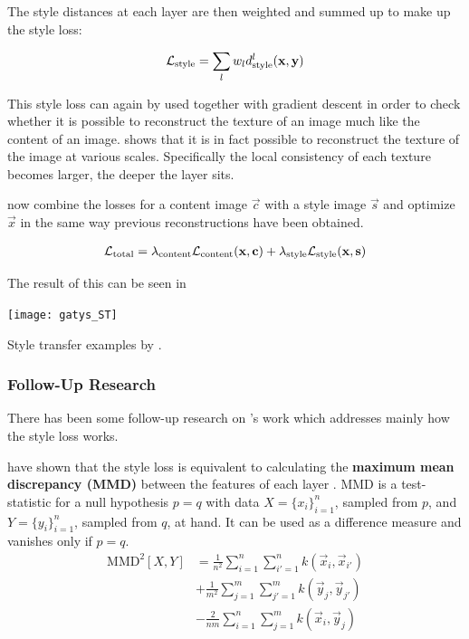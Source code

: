 
The style distances at each layer are then weighted and summed up to make up the style loss:

\begin{align}
    \mathcal{L}_{\text{style}} = \sum_{l} w_l d_{\text{style}}^l(\mathbf{x}, \mathbf{y})
\end{align}

This style loss can again by used together with gradient descent in order to check whether it is possible to reconstruct the texture of an image much like the content of an image.
 shows that it is in fact possible to reconstruct the texture of the image at various scales.
Specifically the local consistency of each texture becomes larger, the deeper the layer sits.

\citeauthor*{gatys} now combine the losses for a content image $\vec{c}$ with a style image $\vec{s}$ and optimize $\vec{x}$ in the same way previous reconstructions have been obtained.

\begin{align}
    \mathcal{L}_{\text{total}} = \lambda_{\text{content}} \mathcal{L}_{\text{content}}(\mathbf{x}, \mathbf{c}) + \lambda_{\text{style}} \mathcal{L}_{\text{style}}(\mathbf{x}, \mathbf{s})
\end{align}


The result of this can be seen in 
\begin{marginfigure}
    \texttt{[image: gatys\_ST]}
    \caption[]{Style transfer examples by \citeauthor*{gatys}. \cite{gatys}}
\end{marginfigure}

\subsubsection{Follow-Up Research}
There has been some follow-up research on \citeauthor*{gatys}'s work which addresses mainly how the style loss works.

\citeauthor*{MMD} have shown that the style loss is equivalent to calculating the \textbf{maximum mean discrepancy (MMD)} between the features of each layer \cite{MMD}.
MMD is a test-statistic for a null hypothesis $p=q$ with data $X = \{x_i\}^n_{i=1}$, sampled from $p$, and $Y = \{y_i\}^n_{i=1}$, sampled from $q$, at hand.
It can be used as a difference measure and vanishes only if $p=q$.
\begin{align}
    \text{MMD}^2[X, Y] & = \frac{1}{n^2} \sum^n_{i=1} \sum^n_{i'=1} k(\vec{x}_i, \vec{x}_{i'}) \\
    & + \frac{1}{m^2} \sum^m_{j=1} \sum^m_{j'=1} k(\vec{y}_j, \vec{y}_{j'}) \\
    & - \frac{2}{nm} \sum^n_{i=1} \sum^m_{j=1} k(\vec{x}_i, \vec{y}_{j})
\end{align}

